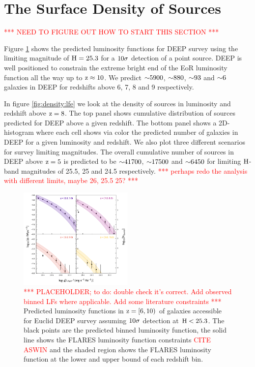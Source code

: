 
\section{The Surface Density of Sources}\label{sec:density}

\textcolor{red}{*** NEED TO FIGURE OUT HOW TO START THIS SECTION ***}

Figure \ref{fig:density:lfs} shows the predicted luminosity functions for \euclid \:\textsc{DEEP} survey using the limiting magnitude of $\rm H = 25.3$ for a $\rm 10\sigma$ detection of a point source. \euclid \:\textsc{DEEP} is well positioned to constrain the extreme bright end of the EoR luminosity function all the way up to $\rm z \approx 10$. We predict  $\rm {\sim}5900$, $\rm {\sim}880$, $\rm {\sim}93$ and $\rm {\sim}6$ galaxies in \euclid \:\textsc{DEEP} for redshifts above 6, 7, 8 and 9 respectively.

In figure \ref{fig:density:lfe} we look at the density of sources in luminosity and redshift above $\rm z=8$. The top panel shows cumulative distribution of sources predicted for \euclid \:\textsc{DEEP} above a given redshift. The bottom panel shows a 2D-histogram where each cell shows via color the predicted number of galaxies in \euclid \:\textsc{DEEP} for a given luminosity and redshift. We also plot three different scenarios for survey limiting magnitudes. The overall cumulative number of sources in \euclid \:\textsc{DEEP} above $\rm z=5$ is predicted to be $\rm {\sim}41700$, $\rm {\sim}17500$ and $\rm {\sim}6450$ for limiting $\rm H$-band magnitudes of 25.5, 25 and 24.5 respectively. \textcolor{red}{*** perhaps redo the analysis with different limits, maybe 26, 25.5 25? ***}



\begin{figure}
	\centering
	\includegraphics[width=0.5\textwidth]{figures/density/LF.pdf}
	\caption{\textcolor{red}{*** PLACEHOLDER; to do: double check it's correct. Add observed binned LFs where applicable. Add some literature constraints ***}{ Predicted luminosity functions in $\rm z = [6, 10)$ of galaxies accessible for Euclid DEEP survey assuming $\rm 10\sigma$ detection at $\rm H < 25.3$. The black points are the predicted binned luminosity function, the solid line shows the \textsc{FLARES} luminosity function constraints \textcolor{red}{CITE ASWIN} and the shaded region shows the \textsc{FLARES} luminosity function at the lower and upper bound of each redshift bin.}
	\label{fig:density:lfs}}
\end{figure}


